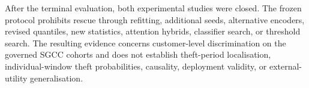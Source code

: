 After the terminal evaluation, both experimental studies were closed. The frozen protocol prohibits rescue through refitting, additional seeds, alternative encoders, revised quantiles, new statistics, attention hybrids, classifier search, or threshold search. The resulting evidence concerns customer-level discrimination on the governed SGCC cohorts and does not establish theft-period localisation, individual-window theft probabilities, causality, deployment validity, or external-utility generalisation.
